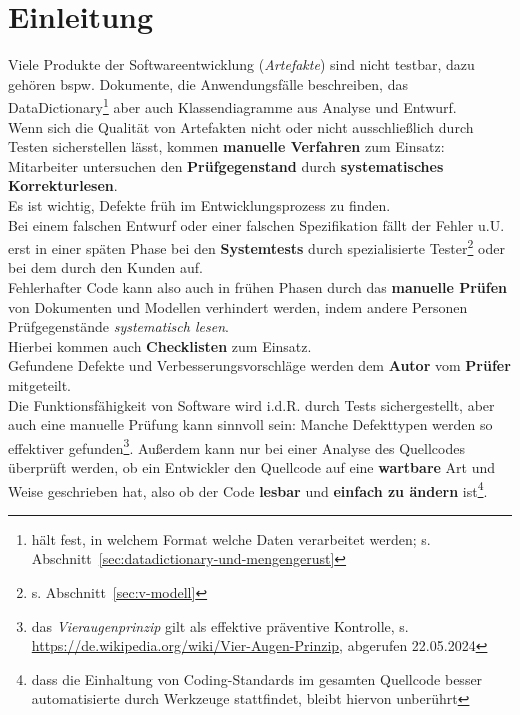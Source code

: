 \section{Einleitung}

Viele Produkte der Softwareentwicklung (\textit{Artefakte}) sind nicht testbar, dazu gehören bspw. Dokumente, die Anwendungsfälle beschreiben, das DataDictionary\footnote{
hält fest, in welchem Format welche Daten verarbeitet werden; s. Abschnitt~\ref{sec:datadictionary-und-mengengerust}
} aber auch Klassendiagramme aus Analyse und Entwurf.\\
Wenn sich die Qualität von Artefakten nicht oder nicht ausschließlich durch Testen sicherstellen lässt, kommen \textbf{manuelle Verfahren} zum Einsatz: Mitarbeiter untersuchen den \textbf{Prüfgegenstand} durch \textbf{systematisches Korrekturlesen}.\\

\noindent
Es ist wichtig, Defekte früh im Entwicklungsprozess zu finden.\\
Bei einem falschen Entwurf oder einer falschen Spezifikation fällt der Fehler u.U. erst in einer späten Phase bei den \textbf{Systemtests} durch spezialisierte Tester\footnote{
s. Abschnitt~\ref{sec:v-modell}
} oder bei dem  durch den Kunden auf.\\
Fehlerhafter Code kann also auch in frühen Phasen durch das \textbf{manuelle Prüfen} von Dokumenten und Modellen verhindert werden, indem andere Personen Prüfgegenstände \textit{systematisch lesen}.\\
Hierbei kommen auch \textbf{Checklisten} zum Einsatz.\\
Gefundene Defekte und Verbesserungsvorschläge werden dem \textbf{Autor} vom \textbf{Prüfer} mitgeteilt.\\

\noindent
Die Funktionsfähigkeit von Software wird i.d.R. durch Tests sichergestellt, aber auch eine manuelle Prüfung kann sinnvoll sein: Manche Defekttypen werden so effektiver gefunden\footnote{
das \textit{Vieraugenprinzip} gilt als effektive präventive Kontrolle, s. \url{https://de.wikipedia.org/wiki/Vier-Augen-Prinzip}, abgerufen 22.05.2024
}.
Außerdem kann nur bei einer Analyse des Quellcodes überprüft werden, ob ein Entwickler den Quellcode auf eine \textbf{wartbare} Art und Weise geschrieben hat, also ob der Code \textbf{lesbar} und \textbf{einfach zu ändern} ist\footnote{
dass die Einhaltung von Coding-Standards im gesamten Quellcode besser automatisierte durch Werkzeuge stattfindet, bleibt hiervon unberührt
}.\\

